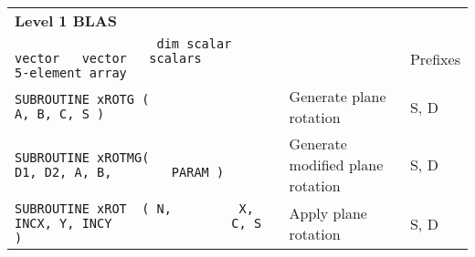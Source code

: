 \documentclass[10pt,a3paper, landscape]{article}
\begin{document}
	\pagestyle{empty}
	\centering
	
	\hspace{0.5cm}
	\begin{tabular}{lll}
		\multicolumn{3}{l}{\Large{\textbf{Level 1 BLAS}}}                                                                                                                                                                                                                                                                                                                                                                                                       \\
		\verb|                   dim scalar vector   vector   scalars              5-element array     |                                                                    &                                                                                                                                                                                                                                                              & Prefixes           \\
		\verb|SUBROUTINE xROTG (                                      A, B, C, S )                     |                                                                    & Generate plane rotation                                                                                                                                                                                                                                      & S, D               \\
		\verb|SUBROUTINE xROTMG(                              D1, D2, A, B,        PARAM )             |                                                                    & Generate modified plane rotation                                                                                                                                                                                                                             & S, D               \\
		\verb|SUBROUTINE xROT  ( N,         X, INCX, Y, INCY                C, S )                     |                                                                    & Apply plane rotation                                                                                                                                                                                                                                         & S, D               \\

\end{tabular}
\end{document}
